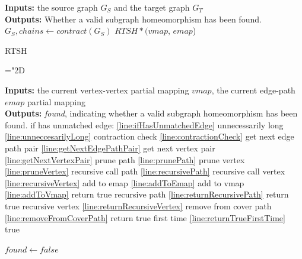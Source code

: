 \begin{Algorithm}{18cm}
\DontPrintSemicolon
\SetAlgoLined
\LinesNumbered
\textbf{Inputs: } the source graph $G_S$ and the target graph $G_T$\\
\textbf{Outputs: } Whether a valid subgraph homeomorphism has been found.\\
 {
	$G_S, \mathit{chains} \longleftarrow \mathit{contract}(G_S)$ 
}
 \Return $\mathit{RTSH*}(\mathit{vmap}$, $\mathit{emap}$)\;
 \caption{RTSH}
 \label{algorithm:ndSHD2-prune}
\end{Algorithm}

\mathchardef\mhyphen="2D %

\begin{Algorithm}[t]{18cm}
\DontPrintSemicolon
\SetAlgoLined
\LinesNumbered
\textbf{Inputs: } the current vertex-vertex partial mapping $\mathit{vmap}$, the current edge-path $\mathit{emap}$ partial mapping\\
\textbf{Outputs: } \textit{found}, indicating whether a valid subgraph homeomorphism has been found. \color{red}if has unmatched edge: \ref{line:ifHasUnmatchedEdge} unnecessarily long \ref{line:unneccesarilyLong} contraction check \ref{line:contractionCheck} get next edge path pair \ref{line:getNextEdgePathPair} get next vertex pair \ref{line:getNextVertexPair} prune path \ref{line:prunePath} prune vertex \ref{line:pruneVertex} recursive call path \ref{line:recursivePath} recursive call vertex \ref{line:recursiveVertex} add to emap \ref{line:addToEmap} add to vmap \ref{line:addToVmap} return true recursive path \ref{line:returnRecursivePath} return true recursive vertex \ref{line:returnRecursiveVertex} remove from cover path \ref{line:removeFromCoverPath} return true first time \ref{line:returnTrueFirstTime}\color{black}\\

 {
	\Return true\label{line:returnTrueFirstTime}\;
}

$\mathit{found} \longleftarrow \mathit{false}$

\end{Algorithm}
